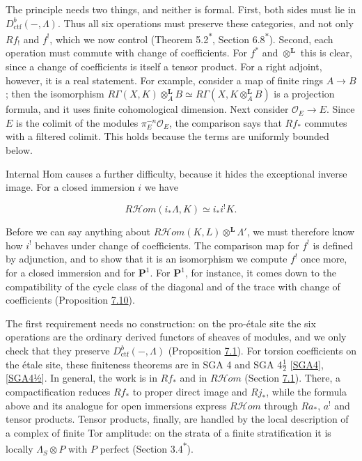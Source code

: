 \documentclass[11pt]{article}
\newcommand{\bpout}[1]{#1\textsuperscript{\hyperlink{bp-outside}{\ensuremath{\ast}}}}
\providecommand{\cHom}{}\renewcommand{\cHom}{R\mathcal{H}\!om}
\begin{document}
The principle needs two things, and neither is formal. First, both sides must lie in \(D^b_{\mathrm{ctf}}(-,\Lambda)\). Thus all six operations must preserve these categories, and not only \(Rf_!\) and \(f^!\), which we now control (Theorem \bpout{5.2}, Section \bpout{6.8}). Second, each operation must commute with change of coefficients. For \(f^*\) and \(\otimes^{\mathbf L}\) this is clear, since a change of coefficients is itself a tensor product. For a right adjoint, however, it is a real statement. For example, consider a map of finite rings \(A\to B\); then the isomorphism \(R\Gamma(X,K)\otimes^{\mathbf L}_AB\simeq
R\Gamma(X,K\otimes^{\mathbf L}_AB)\) is a projection formula, and it uses finite cohomological dimension. Next consider \(\mathcal O_E\to E\). Since \(E\) is the colimit of the modules \(\pi_E^{-n}\mathcal O_E\), the comparison says that \(Rf_*\) commutes with a filtered colimit. This holds because the terms are uniformly bounded below.

Internal Hom causes a further difficulty, because it hides the exceptional inverse image. For a closed immersion \(i\) we have

\[
\cHom(i_*\Lambda,K)\simeq i_*i^!K .
\]

Before we can say anything about \(\cHom(K,L)\otimes^{\mathbf L}\Lambda'\), we must therefore know how \(i^!\) behaves under change of coefficients. The comparison map for \(f^!\) is defined by adjunction, and to show that it is an isomorphism we compute \(f^!\) once more, for a closed immersion and for \(\mathbf P^1\). For \(\mathbf P^1\), for instance, it comes down to the compatibility of the cycle class of the diagonal and of the trace with change of coefficients (Proposition \hyperref[bp26]{7.10}).

The first requirement needs no construction: on the pro-étale site the six operations are the ordinary derived functors of sheaves of modules, and we only check that they preserve \(D^b_{\mathrm{ctf}}(-,\Lambda)\) (Proposition \hyperref[bp5]{7.1}). For torsion coefficients on the étale site, these finiteness theorems are in SGA 4 and SGA 4\(\tfrac12\) [\hyperref[bp37]{SGA4}], [\hyperref[bp38]{SGA4½}]. In general, the work is in \(Rf_*\) and in \(\cHom\) (Section \hyperref[bp3]{7.1}). There, a compactification reduces \(Rf_*\) to proper direct image and \(Rj_*\), while the formula above and its analogue for open immersions express \(\cHom\) through \(Ra_*\), \(a^!\) and tensor products. Tensor products, finally, are handled by the local description of a complex of finite Tor amplitude: on the strata of a finite stratification it is locally \(\Lambda_S\otimes P\) with \(P\) perfect (Section \bpout{3.4}).
\end{document}
